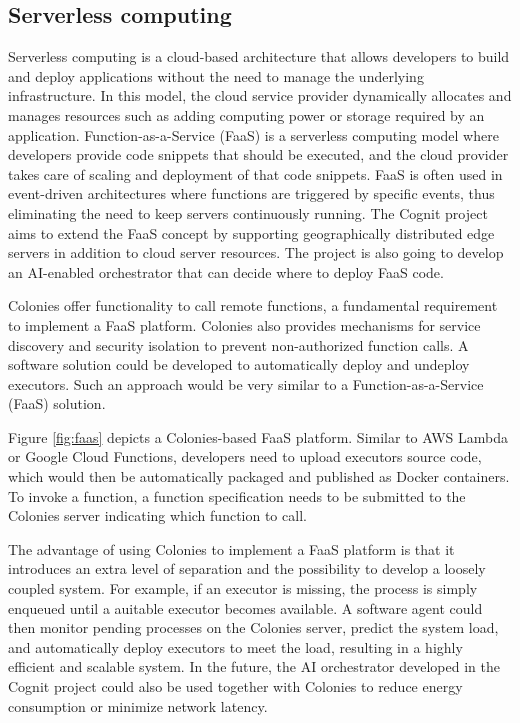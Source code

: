 \documentclass{article}
\begin{document}
\subsection{Serverless computing}
\label{faas}
Serverless computing is a cloud-based architecture that allows developers to build and deploy applications without the need to manage the underlying infrastructure. In this model, the cloud service provider dynamically allocates and manages resources such as adding computing power or storage required by an application. Function-as-a-Service (FaaS) is a serverless computing model where developers provide code snippets that should be executed, and the cloud provider takes care of scaling and deployment of that code snippets. FaaS is often used in event-driven architectures where functions are triggered by specific events, thus eliminating the need to keep servers continuously running. The Cognit project \cite{cognit} aims to extend the FaaS concept by supporting geographically distributed edge servers in addition to cloud server resources. The project is also going to develop an AI-enabled orchestrator that can decide where to deploy FaaS code.

Colonies offer functionality to call remote functions, a fundamental requirement to implement a FaaS platform. Colonies also provides mechanisms for service discovery and security isolation to prevent non-authorized function calls. A software solution could be developed to automatically deploy and undeploy executors. Such an approach would be very similar to a Function-as-a-Service (FaaS) solution.

Figure \ref{fig:faas} depicts a Colonies-based FaaS platform. Similar to AWS Lambda or Google Cloud Functions, developers need to upload executors source code, which would then be automatically packaged and published as Docker containers. To invoke a function, a function specification needs to be submitted to the Colonies server indicating which function to call. 

The advantage of using Colonies to implement a FaaS platform is that it introduces an extra level of separation and the possibility to develop a loosely coupled system. For example, if an executor is missing, the process is simply enqueued until a auitable executor becomes available. A software agent could then monitor pending processes on the Colonies server, predict the system load, and automatically deploy executors to meet the load, resulting in a highly efficient and scalable system. In the future, the AI orchestrator developed in the Cognit project could also be used together with Colonies to reduce energy consumption or minimize network latency.
\end{document}
